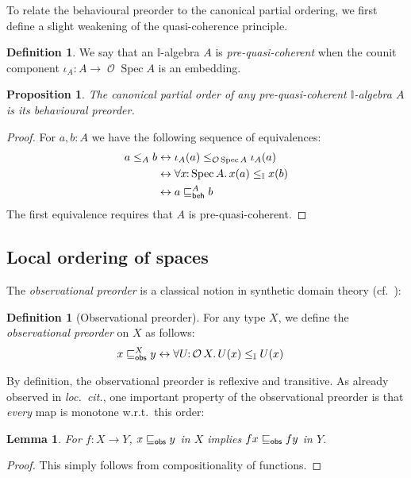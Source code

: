 \documentclass[a4paper,12pt]{amsart}
\newtheorem{lemma}[theorem]{Lemma}
\newtheorem{proposition}[theorem]{Proposition}
\theoremstyle{definition}
\newtheorem{definition}[theorem]{Definition}
\newcommand{\mc}[1]{\mathcal{#1}}
\newcommand{\mbb}[1]{\mathbb{#1}}
\newcommand{\I}{\mbb I}
\newcommand{\fa}[2]{\forall #1\!\colon\!\!#2\mathpunct{.}}
\newcommand{\eq}{\leftrightarrow}
\newcommand{\spec}{\operatorname{Spec}}
\newcommand{\opens}{\operatorname{\mc{O}}} %
\begin{document}
To relate the behavioural preorder to the canonical partial ordering, we first define a slight weakening of the quasi-coherence principle.

\begin{definition}
  We say that an $\I$-algebra $A$ is \emph{pre-quasi-coherent} when the counit component $\iota_A\colon A\to \opens\spec{A}$ is an embedding.
\end{definition}

\begin{proposition}\label{lem:canon-beh-coincide}
  The canonical partial order of any pre-quasi-coherent $\I$-algebra $A$ is its behavioural preorder.
\end{proposition}

\begin{proof}
  For $a,b:A$ we have the following sequence of equivalences:
  \begin{align*}
    a\le_A b 
    &\eq \iota_A(a) \le_{\opens\spec{A}} \iota_A(a)
    \\ 
    &\eq \fa{x}{\spec{A}} x(a) \le_{\I} x(b)
    \\ 
    &\eq a\behle[A]b
  \end{align*}
  The first equivalence requires that $A$ is pre-quasi-coherent.
\end{proof}


\subsection{Local ordering of spaces}

The \emph{observational preorder} is a classical notion in synthetic domain theory (cf.\ \citet{PhoaWesleyKym-Son1991DtiR,hyland1990first}):

\begin{definition}[Observational preorder]\label{defn:specialisation}
  For any type $X$, we define the \emph{observational preorder} on $X$ as follows:
  \begin{align*}
    x\obsle[X] y 
    &\eq \fa{U}{\opens{X}} U(x)\le_\I U(x)
  \end{align*}
\end{definition}

By definition, the observational preorder is reflexive and transitive. As already observed in \emph{loc.\ cit.}, one important property of the observational preorder is that \emph{every} map is monotone w.r.t.\ this order:

\begin{lemma}\label{lem:anymapmonotoneintriscorder}
  For $f \colon X \to Y$, $x \obsle y$ in $X$ implies $fx \obsle fy$ in $Y$.
\end{lemma}
\begin{proof}
  This simply follows from compositionality of functions.
\end{proof}
\end{document}
